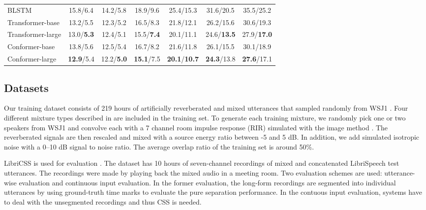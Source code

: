 \documentclass{article}
\begin{document}
\begin{table*}[!t]
\begin{tabular}{l|cccccc}
			BLSTM &  15.8/6.4 & 14.2/5.8 & 18.9/9.6 & 25.4/15.3 & 31.6/20.5 & 35.5/25.2 \\
			
Transformer-base & 13.2/5.5 & 12.3/5.2 & 16.5/8.3 & 21.8/12.1 & 26.2/15.6 & 30.6/19.3 \\
			Transformer-large & 13.0/\textbf{5.3} & 12.4/5.1 & 15.5/\textbf{7.4} & 20.1/11.1 & 24.6/\textbf{13.5} & 27.9/\textbf{17.0} \\
			
			Conformer-base & 13.8/5.6 & 12.5/5.4 & 16.7/8.2 & 21.6/11.8 & 26.1/15.5 & 30.1/18.9 \\
			Conformer-large & \textbf{12.9}/5.4 & 12.2/\textbf{5.0} & \textbf{15.1}/7.5 & \textbf{20.1}/\textbf{10.7} & \textbf{24.3}/13.8 & \textbf{27.6}/17.1 \\ \hline
			\bottomrule
		\end{tabular}
\end{table*}
	\subsection{Datasets}
	Our training dataset consists of 219 hours of artificially reverberated and mixed utterances that sampled randomly from WSJ1 \cite{wsj1}. Four different mixture types described in \cite{yoshioka2018multi} are included in the training set. To generate each training mixture, we randomly pick one or two speakers from  WSJ1 
	and convolve each with a 7 channel room impulse response (RIR) simulated with the image method \cite{imagemethod}. The reverberated signals are then rescaled and mixed with a source energy ratio  between -5 and 5 dB. In addition, we add simulated isotropic noise \cite{habets2007generating} with a 0--10 dB signal to noise ratio. The average overlap ratio of the training set is around 50\%. 
	
	LibriCSS is used for evaluation \cite{chen2020continuous}. 
	The dataset has 10 hours of seven-channel recordings of mixed and concatenated LibriSpeech test utterances. The recordings were made by playing back the mixed audio in a meeting room. 
	Two evaluation schemes are used: utterance-wise evaluation and continuous input evaluation. 
	In the former evaluation, the long-form recordings are segmented into individual utterances by using ground-truth time marks to evaluate the pure separation performance. 
	In the contuous input evaluation, systems have to deal with the unsegmented recordings and thus CSS is needed. 
	
\end{document}
